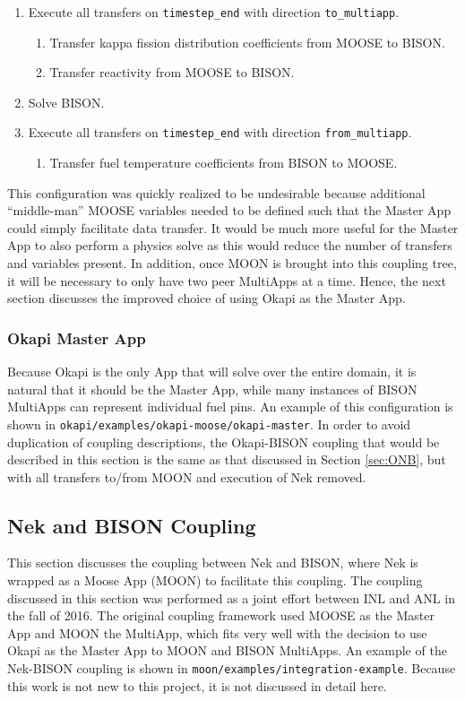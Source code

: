 \documentclass[10pt]{article}
\numberwithin{equation}{section} %
\begin{document}
\begin{enumerate}
\item Execute all transfers on {\tt timestep\_end} with direction {\tt to\_multiapp}.
	\begin{enumerate}
	\item Transfer kappa fission distribution coefficients from MOOSE to BISON.
	\item Transfer reactivity from MOOSE to BISON.
	\end{enumerate}
\item Solve BISON.
\item Execute all transfers on {\tt timestep\_end} with direction {\tt from\_multiapp}.
	\begin{enumerate}
	\item Transfer fuel temperature coefficients from BISON to MOOSE.
	\end{enumerate}
\end{enumerate}

This configuration was quickly realized to be undesirable because additional ``middle-man'' MOOSE variables needed to be defined such that the Master App could simply facilitate data transfer. It would be much more useful for the Master App to also perform a physics solve as this would reduce the number of transfers and variables present. In addition, once MOON is brought into this coupling tree, it will be necessary to only have two peer MultiApps at a time. Hence, the next section discusses the improved choice of using Okapi as the Master App.

\subsubsection{Okapi Master App}
Because Okapi is the only App that will solve over the entire domain, it is natural that it should be the Master App, while many instances of BISON MultiApps can represent individual fuel pins. An example of this configuration is shown in {\tt okapi/examples/okapi-moose/okapi-master}. In order to avoid duplication of coupling descriptions, the Okapi-BISON coupling that would be described in this section is the same as that discussed in Section \ref{sec:ONB}, but with all transfers to/from MOON and execution of Nek removed. 

\subsection{Nek and BISON Coupling}
This section discusses the coupling between Nek and BISON, where Nek is wrapped as a Moose App (MOON) to facilitate this coupling. The coupling discussed in this section was performed as a joint effort between INL and ANL in the fall of 2016. The original coupling framework used MOOSE as the Master App and MOON the MultiApp, which fits very well with the decision to use Okapi as the Master App to MOON and BISON MultiApps. An example of the Nek-BISON coupling is shown in {\tt moon/examples/integration-example}. Because this work is not new to this project, it is not discussed in detail here.
\end{document}
